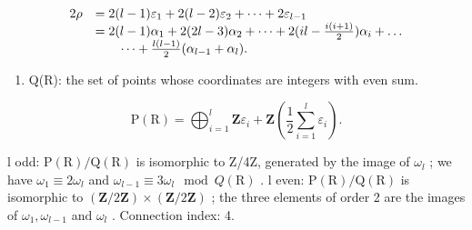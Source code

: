 \[
\begin{array}{r l} 2 \rho & = 2 (l - 1) \varepsilon_ {1} + 2 (l - 2) \varepsilon_ {2} + \dots + 2 \varepsilon_ {l - 1} \\ & = 2 (l - 1) \alpha_ {1} + 2 (2 l - 3) \alpha_ {2} + \dots + 2 (i l - \frac {i (i + 1)}{2}) \alpha_ {i} + \dots \\ & \qquad \dots + \frac {l (l - 1)}{2} (\alpha_ {l - 1} + \alpha_ {l}). \end{array}
\]

\begin{enumerate}
\def\labelenumi{(\Roman{enumi})}
\setcounter{enumi}{7}
\tightlist
\item
  Q(R): the set of points whose coordinates are integers with even sum.
\end{enumerate}

\[
\mathrm{P} (\mathrm{R}) = \bigoplus_ {i = 1} ^ {l} \mathbf {Z} \varepsilon_ {i} + \mathbf {Z} \left(\frac {1}{2} \sum_ {i = 1} ^ {l} \varepsilon_ {i}\right).
\]

l odd: \(\mathrm{P}(\mathrm{R})/\mathrm{Q}(\mathrm{R})\) is isomorphic to Z/4Z, generated by the image of \(\omega_{l}\) ; we have \(\omega_{1} \equiv 2\omega_{l}\) and \(\omega_{l-1} \equiv 3\omega_{l} \mod Q(\mathrm{R})\) . l even: \(\mathrm{P}(\mathrm{R})/\mathrm{Q}(\mathrm{R})\) is isomorphic to \((\mathbf{Z}/2\mathbf{Z}) \times (\mathbf{Z}/2\mathbf{Z})\) ; the three elements of order 2 are the images of \(\omega_{1}, \omega_{l-1}\) and \(\omega_{l}\) . Connection index: 4.

